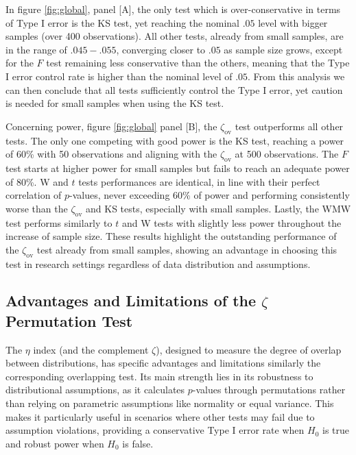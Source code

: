 \documentclass[twocolumn]{article}\usepackage[]{graphicx}\usepackage[]{xcolor}
\begin{document}
In figure \ref{fig:global}, panel [A], the only test which is over-conservative in terms of Type I error is the KS test, yet reaching the nominal $.05$ level with bigger samples (over 400 observations). All other tests, already from small samples, are in the range of $.045 - .055$, converging closer to $.05$ as sample size grows, except for the $F$ test remaining less conservative than the others, meaning that the Type I error control rate is higher than the nominal level of $.05$. From this analysis we can then conclude that all tests sufficiently control the Type I error, yet caution is needed for small samples when using the KS test.

Concerning power, figure \ref{fig:global} panel [B], the $\zeta_{\mbox{ov}}$ test outperforms all other tests. The only one competing with good power is the KS test, reaching a power of 60\% with 50 observations and aligning with the $\zeta_{\mbox{ov}}$ at 500 observations. The $F$ test starts at higher power for small samples but fails to reach an adequate power of 80\%. W and $t$ tests performances are identical, in line with their perfect correlation of $p$-values, never exceeding 60\% of power and performing consistently worse than the $\zeta_{\mbox{ov}}$ and KS tests, especially with small samples. Lastly, the WMW test performs similarly to $t$ and W tests with slightly less power throughout the increase of sample size. These results highlight the outstanding performance of the $\zeta_{\mbox{ov}}$ test already from small samples, showing an advantage in choosing this test in research settings regardless of data distribution and assumptions.

\subsection*{Advantages and Limitations of the $\zeta$ Permutation Test}

The $\eta$ index (and the complement $\zeta$), designed to measure the degree of overlap between distributions, has specific advantages and limitations similarly the corresponding overlapping test.
Its main strength lies in its robustness to distributional assumptions, as it calculates $p$-values through permutations rather than relying on parametric assumptions like normality or equal variance. This makes it particularly useful in scenarios where other tests may fail due to assumption violations, providing a conservative Type I error rate when \(H_0\) is true and robust power when \(H_0\) is false.
\end{document}
